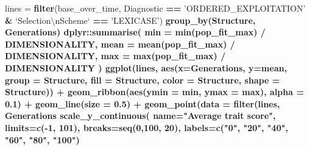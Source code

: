 \documentclass[]{book}
\newenvironment{Shaded}{\begin{snugshade}}{\end{snugshade}}
\newcommand{\CharTok}[1]{\textcolor[rgb]{0.31,0.60,0.02}{#1}}
\newcommand{\DataTypeTok}[1]{\textcolor[rgb]{0.13,0.29,0.53}{#1}}
\newcommand{\DecValTok}[1]{\textcolor[rgb]{0.00,0.00,0.81}{#1}}
\newcommand{\FloatTok}[1]{\textcolor[rgb]{0.00,0.00,0.81}{#1}}
\newcommand{\KeywordTok}[1]{\textcolor[rgb]{0.13,0.29,0.53}{\textbf{#1}}}
\newcommand{\NormalTok}[1]{#1}
\newcommand{\OperatorTok}[1]{\textcolor[rgb]{0.81,0.36,0.00}{\textbf{#1}}}
\newcommand{\StringTok}[1]{\textcolor[rgb]{0.31,0.60,0.02}{#1}}
\begin{document}
\begin{Shaded}
\begin{Highlighting}[]
\NormalTok{lines =}\StringTok{ }\KeywordTok{filter}\NormalTok{(base_over_time, Diagnostic }\OperatorTok{==}\StringTok{ 'ORDERED_EXPLOITATION'} \OperatorTok{&}\StringTok{ `}\DataTypeTok{Selection}\CharTok{\textbackslash{}n}\DataTypeTok{Scheme}\StringTok{`} \OperatorTok{==}\StringTok{ 'LEXICASE'}\NormalTok{) }\OperatorTok{%>%}
\StringTok{  }\KeywordTok{group_by}\NormalTok{(Structure, Generations) }\OperatorTok{%>%}
\StringTok{  }\NormalTok{dplyr}\OperatorTok{::}\KeywordTok{summarise}\NormalTok{(}
    \DataTypeTok{min =} \KeywordTok{min}\NormalTok{(pop_fit_max) }\OperatorTok{/}\StringTok{ }\NormalTok{DIMENSIONALITY,}
    \DataTypeTok{mean =} \KeywordTok{mean}\NormalTok{(pop_fit_max) }\OperatorTok{/}\StringTok{ }\NormalTok{DIMENSIONALITY,}
    \DataTypeTok{max =} \KeywordTok{max}\NormalTok{(pop_fit_max) }\OperatorTok{/}\StringTok{ }\NormalTok{DIMENSIONALITY}
\NormalTok{  )}
\KeywordTok{ggplot}\NormalTok{(lines, }\KeywordTok{aes}\NormalTok{(}\DataTypeTok{x=}\NormalTok{Generations, }\DataTypeTok{y=}\NormalTok{mean, }\DataTypeTok{group =}\NormalTok{ Structure, }\DataTypeTok{fill =}\NormalTok{ Structure, }\DataTypeTok{color =}\NormalTok{ Structure, }\DataTypeTok{shape =}\NormalTok{ Structure)) }\OperatorTok{+}
\StringTok{  }\KeywordTok{geom_ribbon}\NormalTok{(}\KeywordTok{aes}\NormalTok{(}\DataTypeTok{ymin =}\NormalTok{ min, }\DataTypeTok{ymax =}\NormalTok{ max), }\DataTypeTok{alpha =} \FloatTok{0.1}\NormalTok{) }\OperatorTok{+}
\StringTok{  }\KeywordTok{geom_line}\NormalTok{(}\DataTypeTok{size =} \FloatTok{0.5}\NormalTok{) }\OperatorTok{+}
\StringTok{  }\KeywordTok{geom_point}\NormalTok{(}\DataTypeTok{data =} \KeywordTok{filter}\NormalTok{(lines, Generations }\OperatorTok{%%}\StringTok{ }\DecValTok{2000} \OperatorTok{==}\StringTok{ }\DecValTok{0}\NormalTok{), }\DataTypeTok{size =} \FloatTok{2.5}\NormalTok{, }\DataTypeTok{stroke =} \FloatTok{2.0}\NormalTok{, }\DataTypeTok{alpha =} \FloatTok{1.0}\NormalTok{) }\OperatorTok{+}
\StringTok{  }\KeywordTok{scale_y_continuous}\NormalTok{(}
    \DataTypeTok{name=}\StringTok{"Average trait score"}\NormalTok{,}
    \DataTypeTok{limits=}\KeywordTok{c}\NormalTok{(}\OperatorTok{-}\DecValTok{1}\NormalTok{, }\DecValTok{101}\NormalTok{),}
    \DataTypeTok{breaks=}\KeywordTok{seq}\NormalTok{(}\DecValTok{0}\NormalTok{,}\DecValTok{100}\NormalTok{, }\DecValTok{20}\NormalTok{),}
    \DataTypeTok{labels=}\KeywordTok{c}\NormalTok{(}\StringTok{"0"}\NormalTok{, }\StringTok{"20"}\NormalTok{, }\StringTok{"40"}\NormalTok{, }\StringTok{"60"}\NormalTok{, }\StringTok{"80"}\NormalTok{, }\StringTok{"100"}\NormalTok{)}
}}}
\end{Highlighting}
\end{Shaded}
\end{document}
